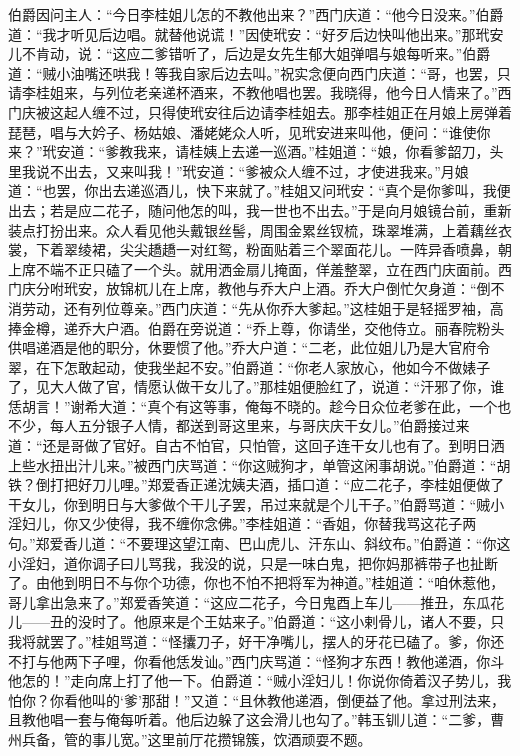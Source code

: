 伯爵因问主人：“今日李桂姐儿怎的不教他出来？”西门庆道：“他今日没来。”伯爵道：“我才听见后边唱。就替他说谎！”因使玳安：“好歹后边快叫他出来。”那玳安儿不肯动，说：“这应二爹错听了，后边是女先生郁大姐弹唱与娘每听来。”伯爵道：“贼小油嘴还哄我！等我自家后边去叫。”祝实念便向西门庆道：“哥，也罢，只请李桂姐来，与列位老亲递杯酒来，不教他唱也罢。我晓得，他今日人情来了。”西门庆被这起人缠不过，只得使玳安往后边请李桂姐去。那李桂姐正在月娘上房弹着琵琶，唱与大妗子、杨姑娘、潘姥姥众人听，见玳安进来叫他，便问：“谁使你来？”玳安道：“爹教我来，请桂姨上去递一巡酒。”桂姐道：“娘，你看爹韶刀，头里我说不出去，又来叫我！”玳安道：“爹被众人缠不过，才使进我来。”月娘道：“也罢，你出去递巡酒儿，快下来就了。”桂姐又问玳安：“真个是你爹叫，我便出去；若是应二花子，随问他怎的叫，我一世也不出去。”于是向月娘镜台前，重新装点打扮出来。众人看见他头戴银丝髻，周围金累丝钗梳，珠翠堆满，上着藕丝衣裳，下着翠绫裙，尖尖趫趫一对红鸳，粉面贴着三个翠面花儿。一阵异香喷鼻，朝上席不端不正只磕了一个头。就用洒金扇儿掩面，佯羞整翠，立在西门庆面前。西门庆分咐玳安，放锦杌儿在上席，教他与乔大户上酒。乔大户倒忙欠身道：“倒不消劳动，还有列位尊亲。”西门庆道：“先从你乔大爹起。”这桂姐于是轻摇罗袖，高捧金樽，递乔大户酒。伯爵在旁说道：“乔上尊，你请坐，交他侍立。丽春院粉头供唱递酒是他的职分，休要惯了他。”乔大户道：“二老，此位姐儿乃是大官府令翠，在下怎敢起动，使我坐起不安。”伯爵道：“你老人家放心，他如今不做婊子了，见大人做了官，情愿认做干女儿了。”那桂姐便脸红了，说道：“汗邪了你，谁恁胡言！”谢希大道：“真个有这等事，俺每不晓的。趁今日众位老爹在此，一个也不少，每人五分银子人情，都送到哥这里来，与哥庆庆干女儿。”伯爵接过来道：“还是哥做了官好。自古不怕官，只怕管，这回子连干女儿也有了。到明日洒上些水扭出汁儿来。”被西门庆骂道：“你这贼狗才，单管这闲事胡说。”伯爵道：“胡铁？倒打把好刀儿哩。”郑爱香正递沈姨夫酒，插口道：“应二花子，李桂姐便做了干女儿，你到明日与大爹做个干儿子罢，吊过来就是个儿干子。”伯爵骂道：“贼小淫妇儿，你又少使得，我不缠你念佛。”李桂姐道：“香姐，你替我骂这花子两句。”郑爱香儿道：“不要理这望江南、巴山虎儿、汗东山、斜纹布。”伯爵道：“你这小淫妇，道你调子曰儿骂我，我没的说，只是一味白鬼，把你妈那裤带子也扯断了。由他到明日不与你个功德，你也不怕不把将军为神道。”桂姐道：“咱休惹他，哥儿拿出急来了。”郑爱香笑道：“这应二花子，今日鬼酉上车儿——推丑，东瓜花儿——丑的没时了。他原来是个王姑来子。”伯爵道：“这小剌骨儿，诸人不要，只我将就罢了。”桂姐骂道：“怪攮刀子，好干净嘴儿，摆人的牙花已磕了。爹，你还不打与他两下子哩，你看他恁发讪。”西门庆骂道：“怪狗才东西！教他递酒，你斗他怎的！”走向席上打了他一下。伯爵道：“贼小淫妇儿！你说你倚着汉子势儿，我怕你？你看他叫的‘爹’那甜！”又道：“且休教他递酒，倒便益了他。拿过刑法来，且教他唱一套与俺每听着。他后边躲了这会滑儿也勾了。”韩玉钏儿道：“二爹，曹州兵备，管的事儿宽。”这里前厅花攒锦簇，饮酒顽耍不题。

